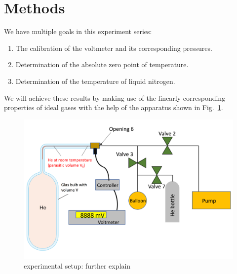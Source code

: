 \section{Methods}


    We have multiple goals in this experiment series:
    \begin{enumerate}
        \item The calibration of the voltmeter and its corresponding pressures.
        \item Determination of the absolute zero point of temperature.
        \item Determination of the temperature of liquid nitrogen.
    \end{enumerate}
    We will achieve these results by making use of the linearly corresponding properties of ideal gases with the help of the apparatus shown in Fig.~\ref{fig_setup}.

    \begin{figure}[H]
        \centering
        \includegraphics[]{src/images/experimental_setup.png}
        \caption{experimental setup: further explain}
        \label{fig_setup}
    \end{figure}

